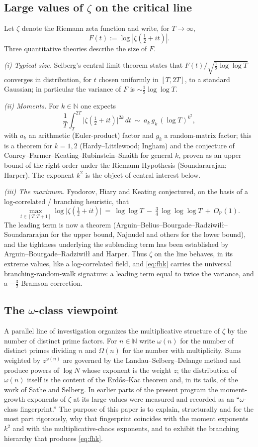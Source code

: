 \documentclass[11pt]{amsart}
\theoremstyle{definition}
\newcommand{\NN}{\mathbb N}
\newcommand{\Pp}{\mathbb P}
\newcommand{\half}{\tfrac12}
\newcommand{\loglog}{\log\log}
\newcommand{\llll}{\log\log\log}
\begin{document}
\subsection{Large values of $\zeta$ on the critical line}
Let $\zeta$ denote the Riemann zeta function and write, for $T\to\infty$,
\[
F(t):=\log|\zeta(\half+it)| .
\]
Three quantitative theories describe the size of $F$.

\emph{(i) Typical size.} Selberg's central limit theorem states that $F(t)/\sqrt{\half\loglog T}$ converges in
distribution, for $t$ chosen uniformly in $[T,2T]$, to a standard Gaussian; in particular the variance of $F$
is $\sim\half\loglog T$.

\emph{(ii) Moments.} For $k\in\NN$ one expects
\[
\frac1T\int_T^{2T}\bigl|\zeta(\half+it)\bigr|^{2k}\,dt\ \sim\ a_k\,g_k\,(\log T)^{k^2},
\]
with $a_k$ an arithmetic (Euler-product) factor and $g_k$ a random-matrix factor; this is a theorem for
$k=1,2$ (Hardy--Littlewood; Ingham) and the conjecture of Conrey--Farmer--Keating--Rubinstein--Snaith for
general $k$, proven as an upper bound of the right order under the Riemann Hypothesis (Soundararajan; Harper).
The exponent $k^2$ is the object of central interest below.

\emph{(iii) The maximum.} Fyodorov, Hiary and Keating conjectured, on the basis of a log-correlated /
branching heuristic, that
\begin{equation}\label{eq:fhk}
\max_{t\in[T,T+1]}\log\bigl|\zeta(\half+it)\bigr|\ =\ \loglog T\ -\ \tfrac34\,\llll T\ +\ O_{\Pp}(1).
\end{equation}
The leading term is now a theorem (Arguin--Belius--Bourgade--Radziwi{\l}{\l}--Soundararajan for the upper bound,
Najnudel and others for the lower bound), and the tightness underlying the subleading term has been established
by Arguin--Bourgade--Radziwi{\l}{\l} and Harper. Thus $\zeta$ on the line behaves, in its extreme values, like a
log-correlated field, and \eqref{eq:fhk} carries the universal branching-random-walk signature: a leading term
equal to twice the variance, and a $-\tfrac32$ Bramson correction.

\subsection{The $\omega$-class viewpoint}
A parallel line of investigation organizes the multiplicative structure of $\zeta$ by the number of distinct
prime factors. For $n\in\NN$ write $\omega(n)$ for the number of distinct primes dividing $n$ and $\Omega(n)$ for
the number with multiplicity. Sums weighted by $z^{\omega(n)}$ are governed by the Landau--Selberg--Delange
method and produce powers of $\log N$ whose exponent is the weight $z$; the distribution of $\omega(n)$ itself is
the content of the Erd\H{o}s--Kac theorem and, in its tails, of the work of Sathe and Selberg. In earlier parts
of the present program the moment-growth exponents of $\zeta$ at its large values were measured and recorded as
an ``$\omega$-class fingerprint.'' The purpose of this paper is to explain, structurally and for the most part
rigorously, why that fingerprint coincides with the moment exponents $k^2$ and with the multiplicative-chaos
exponents, and to exhibit the branching hierarchy that produces \eqref{eq:fhk}.
\end{document}
